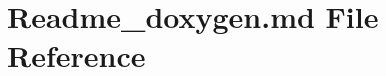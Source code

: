 \hypertarget{Readme__doxygen_8md}{\section{Readme\-\_\-doxygen.\-md File Reference}
\label{Readme__doxygen_8md}
}
